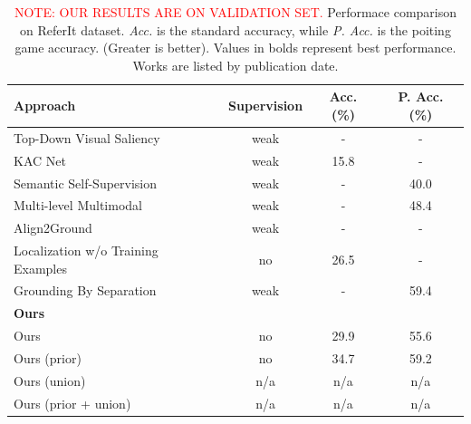 \documentclass{article}
\begin{document}
\begin{table}
  \centering
  \bgroup
  \resizebox{\textwidth}{!} {%
  \begin{tabular}{lccc}
    \toprule
    \textbf{Approach} & \textbf{Supervision} & \textbf{Acc. (\%)} & \textbf{P. Acc. (\%)} \\
    \midrule
    Top-Down Visual Saliency \cite{ramanishka2017top}        & weak & -    & -    \\
    KAC Net \cite{chen2018knowledge}                         & weak & 15.8 & -    \\
    Semantic Self-Supervision \cite{javed2018learning}       & weak & -    & 40.0 \\
    Multi-level Multimodal \cite{akbari2019multi}            & weak & -    & 48.4 \\
    Align2Ground \cite{datta2019align2ground}                & weak & -    & -    \\
    Localization w/o Training Examples \cite{wang2019phrase} & no   & 26.5 & -    \\
    Grounding By Separation \cite{arbelle2021detector}       & weak & -    & 59.4 \\
    \midrule
    \multicolumn{4}{l}{\textbf{Ours}} \\
    Ours                                                     & no   & 29.9 & 55.6 \\
    Ours (prior)                                             & no   & 34.7 & 59.2 \\
    Ours (union)                                             & n/a  & n/a  & n/a  \\
    Ours (prior + union)                                     & n/a  & n/a  & n/a  \\
    \bottomrule
  \end{tabular}
  }
  \egroup
  \caption{%
    \textcolor{red}{NOTE: OUR RESULTS ARE ON VALIDATION
     SET.} \hspace{0.5cm}
     Performace comparison on ReferIt dataset. \textit{Acc.} is the
     standard accuracy, while \textit{P. Acc.} is the poiting game
     accuracy. (Greater is better). Values in bolds represent best
     performance. Works are listed by publication
     date.
    }
  \label{tab:results-referit}
\end{table}


\pagebreak

\printbibliography
\end{document}
